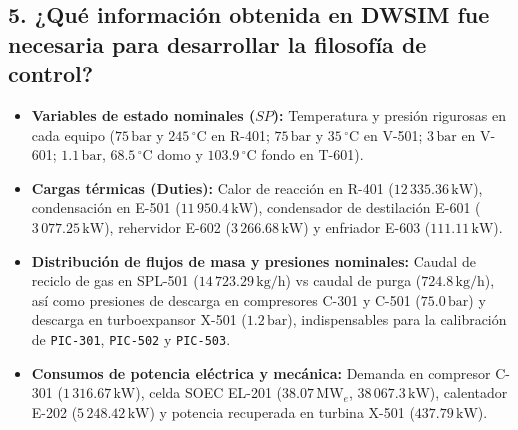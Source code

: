 \documentclass[10pt,letterpaper]{article}
\begin{document}
\subsection*{5. ¿Qué información obtenida en DWSIM fue necesaria para desarrollar la filosofía de control?}
\begin{itemize}
    \item \textbf{Variables de estado nominales ($SP$):} Temperatura y presión rigurosas en cada equipo ($75\,\text{bar}$ y $245\,^\circ\text{C}$ en R-401; $75\,\text{bar}$ y $35\,^\circ\text{C}$ en V-501; $3\,\text{bar}$ en V-601; $1.1\,\text{bar}$, $68.5\,^\circ\text{C}$ domo y $103.9\,^\circ\text{C}$ fondo en T-601).
    \item \textbf{Cargas térmicas (Duties):} Calor de reacción en R-401 ($12\,335.36\,\text{kW}$), condensación en E-501 ($11\,950.4\,\text{kW}$), condensador de destilación E-601 ($3\,077.25\,\text{kW}$), rehervidor E-602 ($3\,266.68\,\text{kW}$) y enfriador E-603 ($111.11\,\text{kW}$).
    \item \textbf{Distribución de flujos de masa y presiones nominales:} Caudal de reciclo de gas en SPL-501 ($14\,723.29\,\text{kg/h}$) vs caudal de purga ($724.8\,\text{kg/h}$), así como presiones de descarga en compresores C-301 y C-501 ($75.0\,\text{bar}$) y descarga en turboexpansor X-501 ($1.2\,\text{bar}$), indispensables para la calibración de \texttt{PIC-301}, \texttt{PIC-502} y \texttt{PIC-503}.
    \item \textbf{Consumos de potencia eléctrica y mecánica:} Demanda en compresor C-301 ($1\,316.67\,\text{kW}$), celda SOEC EL-201 ($38.07\,\text{MW}_e$, $38\,067.3\,\text{kW}$), calentador E-202 ($5\,248.42\,\text{kW}$) y potencia recuperada en turbina X-501 ($437.79\,\text{kW}$).
\end{itemize}
\end{document}
